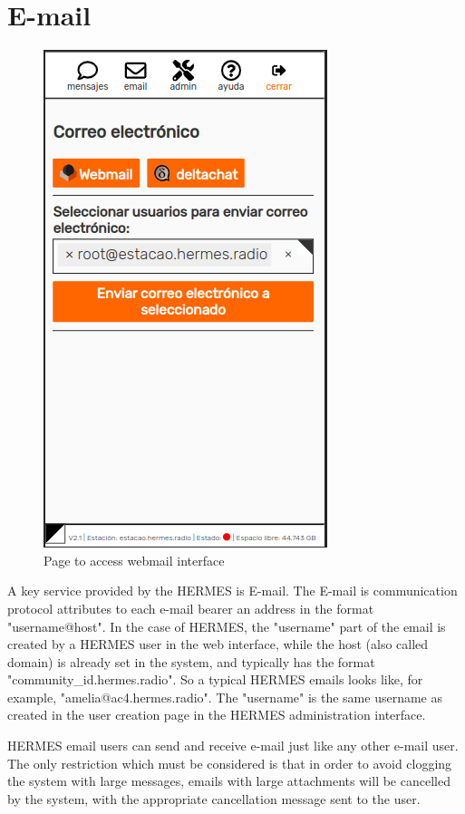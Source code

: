 \documentclass[11pt,a4paper]{article}
\begin{document}
\section{E-mail}
\label{email}

\begin{figure}[H]
    \centering
    \includegraphics[width=0.5\columnwidth]{screenshots/frontend/es/email.png}
    	\caption{Page to access webmail interface}
	\vspace{-10pt}
    \label{fig:webmail2}
\end{figure}

A key service provided by the HERMES is E-mail. The E-mail is communication protocol attributes to each e-mail bearer an address in the format "username@host". In the case of HERMES, the "username" part of the email is created by a HERMES user in the web interface, while the host (also called domain) is already set in the system, and typically has the format "community\_id.hermes.radio". So a typical HERMES emails looks like, for example, "amelia@ac4.hermes.radio". The "username" is the same username as created in the user creation page in the HERMES administration interface.

HERMES email users can send and receive e-mail just like any other e-mail user. The only restriction which must be considered is that in order to avoid clogging the system with large messages, emails with large attachments will be cancelled by the system, with the appropriate cancellation message sent to the user. %
\end{document}
